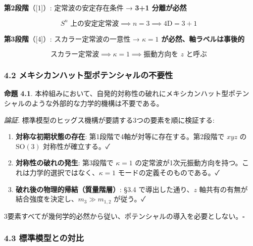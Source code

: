 \documentclass[
  a4paper,11pt]{ltjsarticle}
\begin{document}
\textbf{第2段階}（{[}1{]}）: 定常波の安定存在条件 → \textbf{3+1
分離が必然}

\[\text{$S^n$ 上の安定定常波} \implies n = 3 \implies 4\text{D} = 3 + 1\]

\textbf{第3段階}（{[}4{]}）: スカラー定常波の一意性 →
\textbf{\(\kappa = 1\) が必然、軸ラベルは事後的}

\[\text{スカラー定常波} \implies \kappa = 1 \implies \text{振動方向を $z$ と呼ぶ}\]

\subsubsection{4.2
メキシカンハット型ポテンシャルの不要性}\label{ux30e1ux30adux30b7ux30abux30f3ux30cfux30c3ux30c8ux578bux30ddux30c6ux30f3ux30b7ux30e3ux30ebux306eux4e0dux8981ux6027}

\textbf{命題 4.1}.
本枠組みにおいて、自発的対称性の破れにメキシカンハット型ポテンシャルのような外部的な力学的機構は不要である。

\emph{論証}. 標準模型のヒッグス機構が要請する3つの要素を順に検証する:

\begin{enumerate}
\def\labelenumi{(\roman{enumi})}
\item
  \textbf{対称な初期状態の存在}: 第1段階で4軸が対等に存在する。第2段階で
  \(xyz\) の \(\mathrm{SO}(3)\) 対称性が確立する。✓
\item
  \textbf{対称性の破れの発生}: 第3段階で \(\kappa = 1\)
  の定常波が1次元振動方向を持つ。これは力学的選択ではなく、\(\kappa = 1\)
  モードの定義そのものである。✓
\item
  \textbf{破れ後の物理的帰結（質量階層）}: §3.4 で導出した通り、\(z\)
  軸共有の有無が結合強度を決定し、\(m_3 \gg m_{1,2}\) が従う。✓
\end{enumerate}

3要素すべてが幾何学的必然から従い、ポテンシャルの導入を必要としない。\(\square\)

\subsubsection{4.3
標準模型との対比}\label{ux6a19ux6e96ux6a21ux578bux3068ux306eux5bfeux6bd4}
\end{document}
